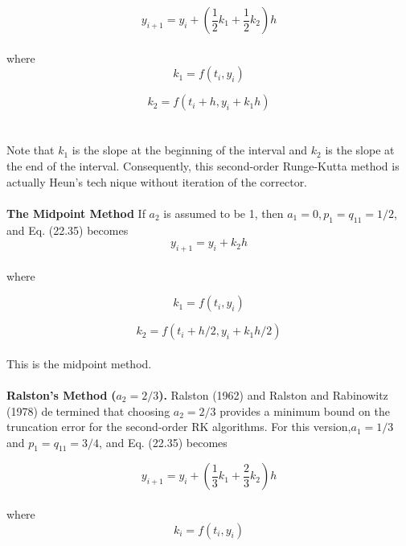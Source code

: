 \begin{equation}
\tag{22.41}
y_{i+1} = y_{i} + \left( \dfrac{1}{2}k_{1} + \dfrac{1}{2}k_{2} \right) h
\end{equation}\\
where
\begin{equation}
\tag{22.41a}
k_{1} = f(t_{i}, y_{i})
\end{equation}

\begin{equation}
\tag{22.41b}
k_{2} = f(t_{i} + h, y_{i} + k_{1}h)
\end{equation}\\
\\
Note that $k_1$ is the slope at the beginning of the interval and $k_2$ is the slope at the end of the
interval. Consequently, this second-order Runge-Kutta method is actually Heun’s technique without iteration of the corrector.\\
\\
\textbf{The Midpoint Method}  If $a_{2}$ is assumed to be 1, then $a_1 = 0, p_1 = q_{11} = 1/2$, and Eq. (22.35) becomes
\begin{equation}
\tag{22.42}
y_{i+1} = y_i + k_2h 
\end{equation}\\
where

\begin{equation}
\tag{22.42a}
k_1 = f(t_i,y_i)
\end{equation}

\begin{equation}
\tag{22.42b}
k_2 = f(t_i + h/2, y_i + k_1h/2)
\end{equation}\\
This is the midpoint method.\\
\\
\textbf{Ralston’s Method} \textbf{($a_2 = 2/3$).} Ralston (1962) and Ralston and Rabinowitz (1978) determined that choosing $a_2 = 2/3$ provides a minimum bound on the truncation error for
the second-order RK algorithms. For this version,$a_1 = 1/3$ and $p_1 = q_{11} = 3/4$, and Eq. (22.35) becomes

\begin{equation}
\tag{22.43}
y_{i+1} = y_i + \left(\dfrac{1}{3} k_1 + \dfrac{2}{3}k_2 \right)h
\end{equation}\\
where
\begin{equation}
\tag{22.43a}
k_i = f(t_i, y_i)
\end{equation}

